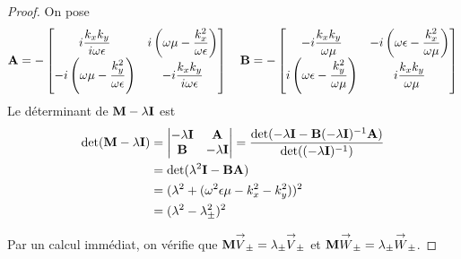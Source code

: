     \begin{proof}
        On pose
        \begin{equation*}
            \mathbf{A} = -\begin{bmatrix}
                i\dfrac{k_xk_y}{i\omega\epsilon} & i\left(\omega\mu - \dfrac{k_x^2}{\omega\epsilon}\right) \\
                -i\left(\omega\mu - \dfrac{k_y^2}{\omega\epsilon}\right) & -i\dfrac{k_xk_y}{i\omega\epsilon} \\
            \end{bmatrix}
            \quad
            \mathbf{B} = -\begin{bmatrix}
                -i\dfrac{k_xk_y}{\omega\mu} & -i\left(\omega\epsilon - \dfrac{k_x^2}{\omega\mu}\right) \\
                i\left(\omega\epsilon - \dfrac{k_y^2}{\omega\mu}\right) & i\dfrac{k_xk_y}{\omega\mu} \\
            \end{bmatrix}
        \end{equation*}
        Le déterminant de \(\mathbf{M}-\lambda \mathbf{I}\) est
        \begin{align*}
            \det(\mathbf{M}-\lambda \mathbf{I}) &=
            \begin{vmatrix}
                -\lambda \mathbf{I} & \mathbf{A} \\
                \mathbf{B} & -\lambda \mathbf{I}
            \end{vmatrix}
                = \dfrac{\det(- \lambda \mathbf{I} - \mathbf{B}(-\lambda \mathbf{I})^{-1} \mathbf{A})}{\det((-\lambda \mathbf{I})^{-1})} \\
                &= \det(\lambda^2 \mathbf{I} - \mathbf{B}\mathbf{A}) \\
                &= (\lambda^2 + (\omega^2\epsilon\mu - k_x^2 -k_y^2))^2 \\
                &= (\lambda^2 - \lambda_\pm^2)^2
        \end{align*}


        Par un calcul immédiat, on vérifie que \(\mathbf{M}{\overset{\rightarrow}{V}}_\pm = \lambda_\pm{\overset{\rightarrow}{V}}_\pm\) et \(\mathbf{M}{\overset{\rightarrow}{W}}_\pm = \lambda_\pm{\overset{\rightarrow}{W}}_\pm\).
    \end{proof}

